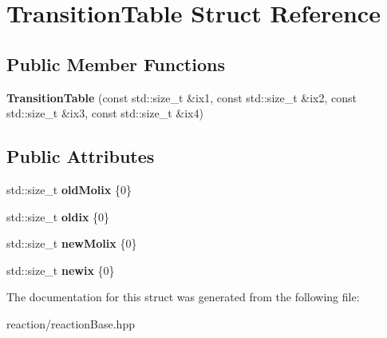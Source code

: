 \hypertarget{structTransitionTable}{}\section{Transition\+Table Struct Reference}
\label{structTransitionTable}
\subsection*{Public Member Functions}
\begin{DoxyCompactItemize}
\item 
\mbox{\label{structTransitionTable_aa2b220b550c79c7b48211c5484ae13be}} 
{\bfseries Transition\+Table} (const std\+::size\+\_\+t \&ix1, const std\+::size\+\_\+t \&ix2, const std\+::size\+\_\+t \&ix3, const std\+::size\+\_\+t \&ix4)
\end{DoxyCompactItemize}
\subsection*{Public Attributes}
\begin{DoxyCompactItemize}
\item 
\mbox{\label{structTransitionTable_ab91971a0da0724c383a8d18957a8a4b4}} 
std\+::size\+\_\+t {\bfseries old\+Molix} \{0\}
\item 
\mbox{\label{structTransitionTable_afed5ad58c234ec2e9c028717def6eb82}} 
std\+::size\+\_\+t {\bfseries oldix} \{0\}
\item 
\mbox{\label{structTransitionTable_adc7b9bd91e216846e38e45db12bf1bd0}} 
std\+::size\+\_\+t {\bfseries new\+Molix} \{0\}
\item 
\mbox{\label{structTransitionTable_a309d4aec7a7d534805ecaf85d4875eef}} 
std\+::size\+\_\+t {\bfseries newix} \{0\}
\end{DoxyCompactItemize}


The documentation for this struct was generated from the following file\+:\begin{DoxyCompactItemize}
\item 
reaction/reaction\+Base.\+hpp\end{DoxyCompactItemize}
